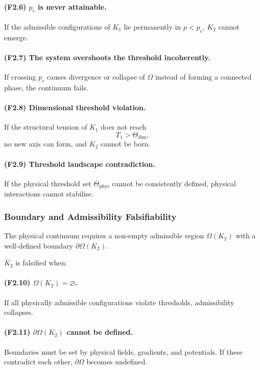 \paragraph{(F2.6) \texorpdfstring{$p_c$}{p_c} is never attainable.}
If the admissible configurations of $K_1$ lie permanently in
$p<p_c$, $K_2$ cannot emerge.

\paragraph{(F2.7) The system overshoots the threshold incoherently.}
If crossing $p_c$ causes divergence or collapse of $\Omega$ instead of
forming a connected phase, the continuum fails.

\paragraph{(F2.8) Dimensional threshold violation.}
If the structural tension of $K_1$ does not reach
\[
T_1 > \Theta_{\mathrm{dim}},
\]
no new axis can form, and $K_2$ cannot be born.

\paragraph{(F2.9) Threshold landscape contradiction.}
If the physical threshold set $\Theta_{\mathrm{phys}}$ cannot be
consistently defined, physical interactions cannot stabilise.



\subsubsection{Boundary and Admissibility Falsifiability}

The physical continuum requires a non-empty admissible region
$\Omega(K_2)$ with a well-defined boundary $\partial\Omega(K_2)$.

$K_2$ is falsified when:

\paragraph{(F2.10) \texorpdfstring{$\Omega(K_2)=\varnothing$}{\Omega(K_2)=\varnothing}.}
If all physically admissible configurations violate thresholds,
admissibility collapses.

\paragraph{(F2.11) \texorpdfstring{$\partial\Omega(K_2)$}{\partial\Omega(K_2)} cannot be defined.}
Boundaries must be set by physical fields, gradients, and potentials.
If these contradict each other, $\partial\Omega$ becomes undefined.

